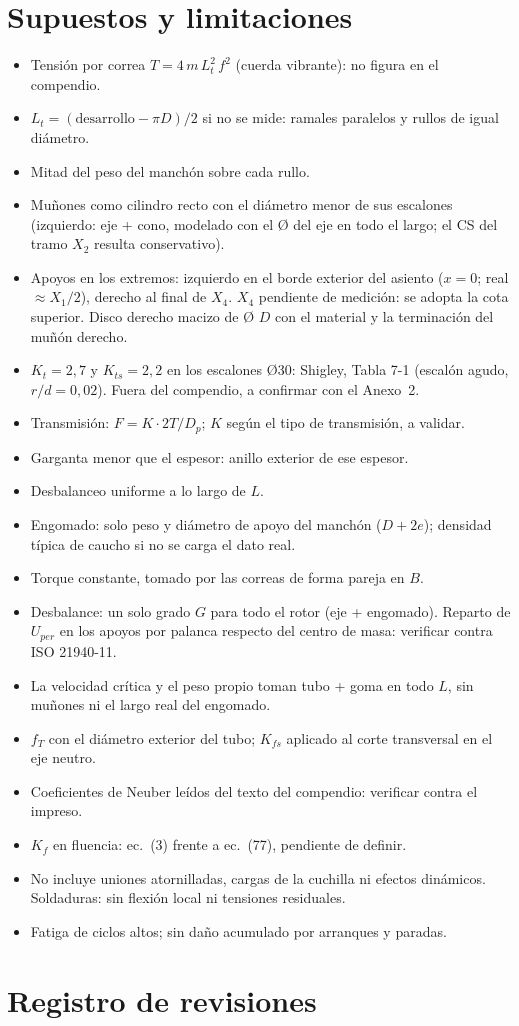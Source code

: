 \documentclass[11pt,a4paper]{article}
\newcommand{\supu}{\textsuperscript{*}}   %
\begin{document}
\section{Supuestos y limitaciones}\label{sec:sup}
\begin{itemize}\setlength\itemsep{1pt}
\item[\supu] Tensión por correa $T=4\,m\,L_t^2\,f^2$ (cuerda vibrante): no figura en el compendio.
\item[\supu] $L_t=(\text{desarrollo}-\pi D)/2$ si no se mide: ramales paralelos y rullos de igual diámetro.
\item[\supu] Mitad del peso del manchón sobre cada rullo.
\item[\supu] Muñones como cilindro recto con el diámetro menor de sus escalones (izquierdo: eje + cono, modelado con el Ø del eje en todo el largo; el CS del tramo $X_2$ resulta conservativo).
\item[\supu] Apoyos en los extremos: izquierdo en el borde exterior del asiento ($x=0$; real $\approx X_1/2$), derecho al final de $X_4$. $X_4$ pendiente de medición: se adopta la cota superior. Disco derecho macizo de Ø $D$ con el material y la terminación del muñón derecho.
\item[\supu] $K_t=2{,}7$ y $K_{ts}=2{,}2$ en los escalones Ø30: Shigley, Tabla 7-1 (escalón agudo, $r/d=0{,}02$). Fuera del compendio, a confirmar con el Anexo~2.
\item[\supu] Transmisión: $F=K\cdot 2T/D_p$; $K$ según el tipo de transmisión, a validar.
\item[\supu] Garganta menor que el espesor: anillo exterior de ese espesor.
\item[\supu] Desbalanceo uniforme a lo largo de $L$.
\item[\supu] Engomado: solo peso y diámetro de apoyo del manchón ($D+2e$); densidad típica de caucho si no se carga el dato real.
\item[\supu] Torque constante, tomado por las correas de forma pareja en $B$.
\item[\supu] Desbalance: un solo grado $G$ para todo el rotor (eje + engomado). Reparto de $U_{per}$ en los apoyos por palanca respecto del centro de masa: verificar contra ISO 21940-11.
\item[\supu] La velocidad crítica y el peso propio toman tubo + goma en todo $L$, sin muñones ni el largo real del engomado.
\item[\supu] $f_T$ con el diámetro exterior del tubo; $K_{fs}$ aplicado al corte transversal en el eje neutro.
\item[\supu] Coeficientes de Neuber leídos del texto del compendio: verificar contra el impreso.
\item[\supu] $K_f$ en fluencia: ec.~(3) frente a ec.~(77), pendiente de definir.
\item No incluye uniones atornilladas, cargas de la cuchilla ni efectos dinámicos. Soldaduras: sin flexión local ni tensiones residuales.
\item Fatiga de ciclos altos; sin daño acumulado por arranques y paradas.
\end{itemize}

\section{Registro de revisiones}

\end{document}

